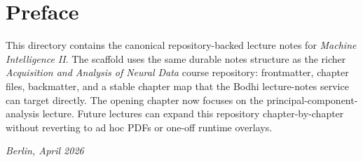 \chapter*{Preface}

This directory contains the canonical repository-backed lecture notes for \emph{Machine Intelligence II}. The scaffold uses the same durable notes structure as the richer \emph{Acquisition and Analysis of Neural Data} course repository: frontmatter, chapter files, backmatter, and a stable chapter map that the Bodhi lecture-notes service can target directly.
The opening chapter now focuses on the principal-component-analysis lecture. Future lectures can expand this repository chapter-by-chapter without reverting to ad hoc PDFs or one-off runtime overlays.

\bigskip
\noindent\textit{Berlin, April 2026}
